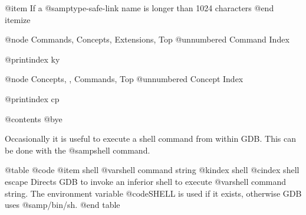 @item
If a @samp{type-safe-link} name is longer than 1024 characters
@end itemize

@node Commands, Concepts, Extensions, Top
@unnumbered Command Index

@printindex ky

@node Concepts, , Commands, Top
@unnumbered Concept Index

@printindex cp

@contents
@bye




Occasionally it is useful to execute a shell command from within GDB.
This can be done with the @samp{shell} command.

@table @code
@item shell @var{shell command string}
@kindex shell
@cindex shell escape
Directs GDB to invoke an inferior shell to execute @var{shell command string}.
The environment variable @code{SHELL} is used if it exists, otherwise GDB
uses @samp{/bin/sh}.
@end table
